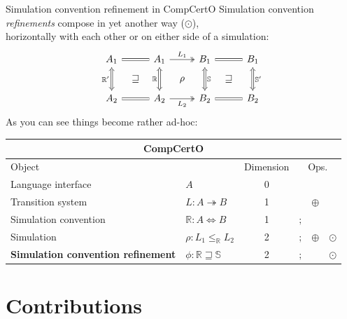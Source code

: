 \documentclass[aspectratio=1610,12pt]{beamer}
\begin{document}
\begin{frame}[fragile]{Simulation convention refinement in CompCertO} %
  Simulation convention \emph{refinements} compose in yet another way ($\odot$), \\
  horizontally with each other or on either side of a simulation:
  \[
      \begin{tikzcd}[sep=tiny]
        A_1 \ar[rr, equals] \ar[dd, Leftrightarrow, "\mathbb{R}'"'] &&
        A_1 \ar[rr, twoheadrightarrow, "L_1"] \ar[dd, Leftrightarrow, "\mathbb{R}"'] &&
        B_1 \ar[dd, Leftrightarrow, "\mathbb{S}"] \ar[rr, equals] &&
        B_1 \ar[dd, Leftrightarrow, "\mathbb{S}'"] \\
        & \sqsupseteq && \rho && \sqsupseteq \\
        A_2 \ar[rr, equals] &&
        A_2 \ar[rr, twoheadrightarrow, "L_2"'] &&
        B_2 \ar[rr, equals] &&
        B_2
      \end{tikzcd}
  \]
  As you can see things become rather ad-hoc:
  \scriptsize
  \begin{center}
    \begin{tabular}{llcll@{\:}l}
      \toprule
      \multicolumn{6}{c}{\textbf{CompCertO}} \\
      \midrule
      Object & & Dimension & \multicolumn{3}{c}{Ops.} \\
      \midrule
      Language interface & $A$ & 0 & \\
      Transition system & $L : A \twoheadrightarrow B$ & 1 & & $\oplus$ \\
      Simulation convention & $\mathbb{R} : A \Leftrightarrow B$ & 1 & $\mathbin;$ \\
      Simulation & $\rho : L_1 \le_\mathbb{R} L_2$ & 2 & $\mathbin;$ & $\oplus$ & $\odot$ \\
      \textbf{Simulation convention refinement} & $\phi : \mathbb{R} \sqsupseteq \mathbb{S}$ & 2 & $\mathbin;$ & & $\odot$
      \\
      \bottomrule
    \end{tabular}
  \end{center}
\end{frame}

\section{Contributions}
\frame{\sectionpage}
\end{document}
